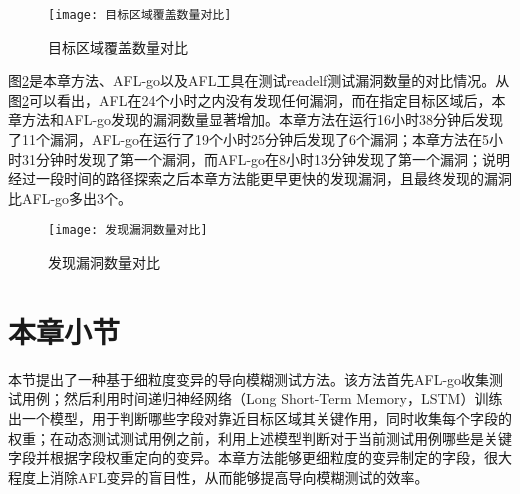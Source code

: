 \begin{figure}[htb]
\begin{center}
\texttt{[image: 目标区域覆盖数量对比]}
\end{center}
\caption{目标区域覆盖数量对比}
\label{目标区域覆盖数量对比}
\end{figure}

图\ref{发现漏洞数量对比}是本章方法、AFL-go以及AFL工具在测试readelf测试漏洞数量的对比情况。从图\ref{发现漏洞数量对比}可以看出，AFL在24个小时之内没有发现任何漏洞，而在指定目标区域后，本章方法和AFL-go发现的漏洞数量显著增加。本章方法在运行16小时38分钟后发现了11个漏洞，AFL-go在运行了19个小时25分钟后发现了6个漏洞；本章方法在5小时31分钟时发现了第一个漏洞，而AFL-go在8小时13分钟发现了第一个漏洞；说明经过一段时间的路径探索之后本章方法能更早更快的发现漏洞，且最终发现的漏洞比AFL-go多出3个。
\begin{figure}[htb]
\begin{center}
\texttt{[image: 发现漏洞数量对比]}
\end{center}
\caption{发现漏洞数量对比}
\label{发现漏洞数量对比}
\end{figure}

\section{本章小节}

本节提出了一种基于细粒度变异的导向模糊测试方法。该方法首先AFL-go收集测试用例；然后利用时间递归神经网络（Long Short-Term Memory，LSTM）训练出一个模型，用于判断哪些字段对靠近目标区域其关键作用，同时收集每个字段的权重；在动态测试测试用例之前，利用上述模型判断对于当前测试用例哪些是关键字段并根据字段权重定向的变异。本章方法能够更细粒度的变异制定的字段，很大程度上消除AFL变异的盲目性，从而能够提高导向模糊测试的效率。